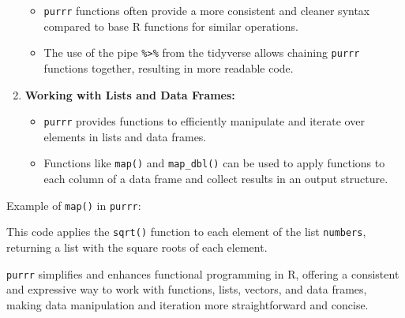 \documentclass[
]{article}
\newenvironment{Shaded}{}{}
\newcommand{\AttributeTok}[1]{\textcolor[rgb]{0.49,0.56,0.16}{#1}}
\newcommand{\CommentTok}[1]{\textcolor[rgb]{0.38,0.63,0.69}{\textit{#1}}}
\newcommand{\DecValTok}[1]{\textcolor[rgb]{0.25,0.63,0.44}{#1}}
\newcommand{\FunctionTok}[1]{\textcolor[rgb]{0.02,0.16,0.49}{#1}}
\newcommand{\NormalTok}[1]{#1}
\newcommand{\OtherTok}[1]{\textcolor[rgb]{0.00,0.44,0.13}{#1}}
\newcommand{\SpecialCharTok}[1]{\textcolor[rgb]{0.25,0.44,0.63}{#1}}
\begin{document}
\begin{enumerate}
  \begin{itemize}
  \item
    \texttt{purrr} functions often provide a more consistent and cleaner
    syntax compared to base R functions for similar operations.
  \item
    The use of the pipe \texttt{\%\textgreater{}\%} from the tidyverse
    allows chaining \texttt{purrr} functions together, resulting in more
    readable code.
  \end{itemize}
\item
  \textbf{Working with Lists and Data Frames:}

  \begin{itemize}
  \item
    \texttt{purrr} provides functions to efficiently manipulate and
    iterate over elements in lists and data frames.
  \item
    Functions like \texttt{map()} and \texttt{map\_dbl()} can be used to
    apply functions to each column of a data frame and collect results
    in an output structure.
  \end{itemize}
\end{enumerate}

Example of \texttt{map()} in \texttt{purrr}:

\begin{Shaded}
\end{Shaded}

This code applies the \texttt{sqrt()} function to each element of the
list \texttt{numbers}, returning a list with the square roots of each
element.

\texttt{purrr} simplifies and enhances functional programming in R,
offering a consistent and expressive way to work with functions, lists,
vectors, and data frames, making data manipulation and iteration more
straightforward and concise.
\end{document}
